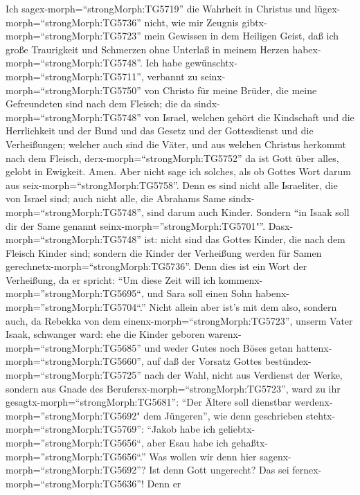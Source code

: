  Ich sagex-morph=``strongMorph:TG5719'' die Wahrheit in
Christus und lügex-morph=``strongMorph:TG5736'' nicht, wie mir Zeugnis
gibtx-morph=``strongMorph:TG5723'' mein Gewissen in dem Heiligen Geist,
 daß ich große Traurigkeit und Schmerzen ohne Unterlaß in
meinem Herzen habex-morph=``strongMorph:TG5748''.  Ich habe
gewünschtx-morph=``strongMorph:TG5711'', verbannt zu
seinx-morph=``strongMorph:TG5750'' von Christo für meine Brüder, die
meine Gefreundeten sind nach dem Fleisch;  die da
sindx-morph=``strongMorph:TG5748'' von Israel, welchen gehört die
Kindschaft und die Herrlichkeit und der Bund und das Gesetz und der
Gottesdienst und die Verheißungen;  welcher auch sind die
Väter, und aus welchen Christus herkommt nach dem Fleisch,
derx-morph=``strongMorph:TG5752'' da ist Gott über alles, gelobt in
Ewigkeit. Amen.  Aber nicht sage ich solches, als ob Gottes
Wort darum aus seix-morph=``strongMorph:TG5758''. Denn es sind nicht
alle Israeliter, die von Israel sind;  auch nicht alle, die
Abrahams Same sindx-morph=``strongMorph:TG5748'', sind darum auch
Kinder. Sondern ``in Isaak soll dir der Same genannt
seinx-morph=''strongMorph:TG5701"''. 
Dasx-morph=``strongMorph:TG5748'' ist: nicht sind das Gottes Kinder, die
nach dem Fleisch Kinder sind; sondern die Kinder der Verheißung werden
für Samen gerechnetx-morph=``strongMorph:TG5736''.  Denn
dies ist ein Wort der Verheißung, da er spricht: ``Um diese Zeit will
ich kommenx-morph=''strongMorph:TG5695``, und Sara soll einen Sohn
habenx-morph=''strongMorph:TG5704``.''  Nicht allein aber
ist's mit dem also, sondern auch, da Rebekka von dem
einenx-morph=``strongMorph:TG5723'', unserm Vater Isaak, schwanger ward:
 ehe die Kinder geboren warenx-morph=``strongMorph:TG5685''
und weder Gutes noch Böses getan hattenx-morph=``strongMorph:TG5660'',
auf daß der Vorsatz Gottes bestündex-morph=``strongMorph:TG5725'' nach
der Wahl,  nicht aus Verdienst der Werke, sondern aus Gnade
des Berufersx-morph=``strongMorph:TG5723'', ward zu ihr
gesagtx-morph=``strongMorph:TG5681'': ``Der Ältere soll dienstbar
werdenx-morph=''strongMorph:TG5692" dem Jüngeren'',  wie
denn geschrieben stehtx-morph=``strongMorph:TG5769'': ``Jakob habe ich
geliebtx-morph=''strongMorph:TG5656``, aber Esau habe ich
gehaßtx-morph=''strongMorph:TG5656``.''  Was wollen wir
denn hier sagenx-morph=``strongMorph:TG5692''? Ist denn Gott ungerecht?
Das sei fernex-morph=``strongMorph:TG5636''!  Denn er
